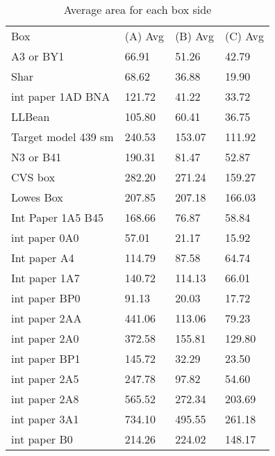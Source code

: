 \documentclass[11pt, twoside, reqno]{book}
\begin{document}
\begin{table}[]
	\centering

	\label{AR2A}
	\begin{tabular}{llll}
		Box                 & (A) Avg & (B) Avg & (C) Avg \\
		A3 or BY1           & 66.91   & 51.26   & 42.79   \\
		Shar                & 68.62   & 36.88   & 19.90   \\
		int paper 1AD BNA   & 121.72  & 41.22   & 33.72   \\
		LLBean              & 105.80  & 60.41   & 36.75   \\
		Target model 439 sm & 240.53  & 153.07  & 111.92  \\
		N3 or B41           & 190.31  & 81.47   & 52.87   \\
		CVS box             & 282.20  & 271.24  & 159.27  \\
		Lowes Box           & 207.85  & 207.18  & 166.03  \\
		Int Paper 1A5 B45   & 168.66  & 76.87   & 58.84   \\
		int paper 0A0       & 57.01   & 21.17   & 15.92   \\
		Int paper A4        & 114.79  & 87.58   & 64.74   \\
		Int paper 1A7       & 140.72  & 114.13  & 66.01   \\
		int paper BP0       & 91.13   & 20.03   & 17.72   \\
		int paper 2AA       & 441.06  & 113.06  & 79.23   \\
		int paper 2A0       & 372.58  & 155.81  & 129.80  \\
		int paper BP1       & 145.72  & 32.29   & 23.50   \\
		int paper 2A5       & 247.78  & 97.82   & 54.60   \\
		int paper 2A8       & 565.52  & 272.34  & 203.69  \\
		int paper 3A1       & 734.10  & 495.55  & 261.18  \\
		int paper B0        & 214.26  & 224.02  & 148.17 
	\end{tabular}
\caption{Average area for each box side}
\end{table}
\end{document}

